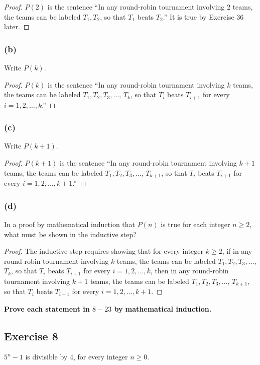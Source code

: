 \documentclass[14pt]{extarticle}
\newcommand{\cy}{\color{cyan}}
\begin{document}
\begin{proof}
    $P(2)$ is the sentence ``In any round-robin tournament involving $2$ teams, the teams can be labeled $T_1, T_2$, so that $T_1$ beats $T_{2}$.'' It is true by Exercise 36 later.
\end{proof}

\subsubsection{(b)}
Write $P(k)$.

\begin{proof}
    $P(k)$ is the sentence ``In any round-robin tournament involving $k$ teams, the teams can be labeled $T_1, T_2, T_3, \ldots$, $T_k$, so that $T_i$ beats $T_{i + 1}$ for every $i = 1, 2, \ldots, k$.''
\end{proof}

\subsubsection{(c)}
Write $P(k + 1)$.

\begin{proof}
    $P(k + 1)$ is the sentence ``In any round-robin tournament involving $k + 1$ teams, the teams can be labeled $T_1, T_2, T_3, \ldots$, $T_{k + 1}$, so that $T_i$ beats $T_{i + 1}$ for every $i = 1, 2, \ldots, k + 1$.''
\end{proof}

\subsubsection{(d)}
In a proof by mathematical induction that $P(n)$ is true for each integer $n \geq 2$, what must be shown in the inductive step?

\begin{proof}
    The inductive step requires showing that for every integer $k \geq 2$, if in any round-robin tournament involving $k$ teams, the teams can be labeled $T_1, T_2, T_3, \ldots$, $T_k$, so that $T_i$ beats $T_{i + 1}$ for every $i = 1, 2, \ldots, k$, then in any round-robin tournament involving $k + 1$ teams, the teams can be labeled $T_1, T_2, T_3, \ldots$, $T_{k + 1}$, so that $T_i$ beats $T_{i + 1}$ for every $i = 1, 2, \ldots, k + 1$.
\end{proof}

{\bf \cy Prove each statement in $8-23$ by mathematical induction.}

\subsection{Exercise 8}
$5^n - 1$ is divisible by 4, for every integer $n \geq 0$.
\end{document}
